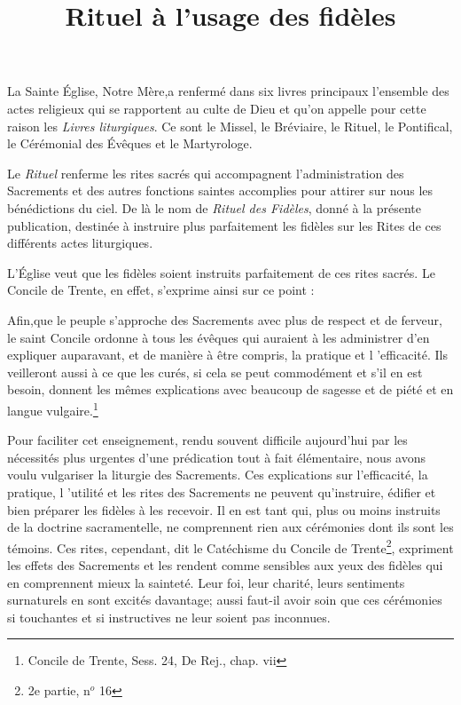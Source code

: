 \documentclass[%
fontsize=12%
,a5paper%
,DIV=15%
]{scrartcl}
\title{Rituel à l'usage des fidèles}
\author{}
\date{}
\begin{document}
\maketitle
\newpage
\chap
{}
La Sainte Église, Notre Mère,a renfermé dans six livres principaux
l'ensemble des actes religieux qui se rapportent au
culte de Dieu et qu'on appelle pour cette raison les \emph{Livres
liturgiques}. Ce sont le Missel, le Bréviaire, le Rituel, le Pontifical,
le Cérémonial des Évêques et le Martyrologe.

Le \emph{Rituel} renferme les rites sacrés qui accompagnent l'administration
des Sacrements et des autres fonctions saintes accomplies
pour attirer sur nous les bénédictions du ciel. De là
le nom de \emph{Rituel des Fidèles}, donné à la présente publication,
destinée à instruire plus parfaitement les fidèles sur les Rites
de ces différents actes liturgiques.

L'Église veut que les fidèles soient instruits parfaitement
de ces rites sacrés. Le Concile de Trente, en effet, s'exprime
ainsi sur ce point  :

\og Afin,que le peuple s'approche des Sacrements avec plus
de respect et de ferveur, le saint Concile ordonne à tous les
évêques qui auraient à les administrer d'en expliquer auparavant,
et de manière à être compris, la pratique et l 'efficacité.
Ils veilleront aussi à ce que les curés, si cela se peut commodément
et s'il en est besoin, donnent les mêmes explications avec
beaucoup de sagesse et de piété et en langue vulgaire.\fg \footnote{Concile de Trente, Sess. 24, De Rej., chap. vii}

Pour faciliter cet enseignement, rendu souvent difficile
aujourd'hui par les nécessités plus urgentes d'une prédication
tout à fait élémentaire, nous avons voulu vulgariser la liturgie
des Sacrements. Ces explications sur l'efficacité, la pratique,
l 'utilité et les rites des Sacrements ne peuvent qu'instruire,
édifier et bien préparer les fidèles à les recevoir. Il en est tant
qui, plus ou moins instruits de la doctrine sacramentelle, ne
comprennent rien aux cérémonies dont ils sont les témoins.
\og Ces rites, cependant, dit le Catéchisme du Concile de Trente\footnote{2e partie, n$^o$ 16}, expriment les effets des Sacrements et les
rendent comme sensibles aux yeux des fidèles qui en comprennent mieux la sainteté. Leur foi, leur charité, leurs sentiments
surnaturels en sont excités davantage; aussi faut-il
avoir soin que ces cérémonies si touchantes et si instructives
ne leur soient pas inconnues.\fg
\end{document}
